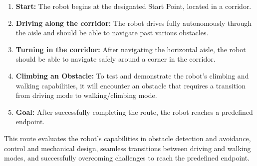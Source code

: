 \documentclass{article}
\begin{document}
\begin{enumerate}
    \item \textbf{Start:} The robot begins at the designated Start Point, located in a corridor.
    \item \textbf{Driving along the corridor:} The robot drives fully autonomously through the aisle and should be able to navigate past various obstacles.
    \item \textbf{Turning in the corridor:} After navigating the horizontal aisle, the robot should be able to navigate safely around a corner in the corridor.
    \item \textbf{Climbing an Obstacle:} To test and demonstrate the robot's climbing and walking capabilities, it will encounter an obstacle that requires a transition from driving mode to walking/climbing mode.
    \item \textbf{Goal:} After successfully completing the route, the robot reaches a predefined endpoint.
\end{enumerate}

This route evaluates the robot's capabilities in obstacle detection and avoidance, control and mechanical design, seamless transitions between driving and walking modes, and successfully overcoming challenges to reach the predefined endpoint.
\end{document}
